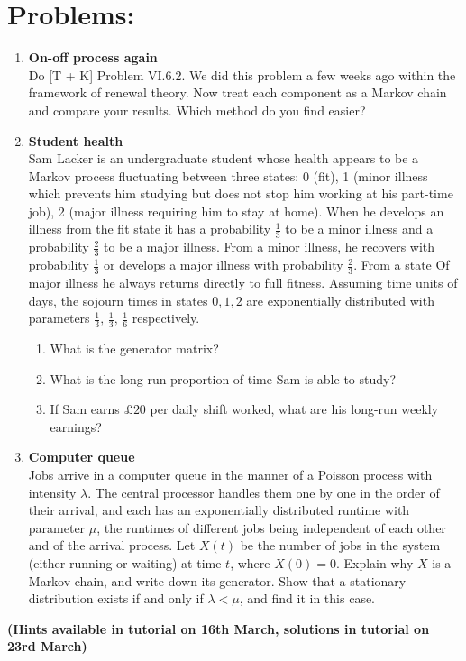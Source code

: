 \documentclass[11pt,a4paper]{article}
\begin{document}
  \section*{Problems:}
  \begin{enumerate}
    \item \textbf{On-off process again}\\
    Do [T + K] Problem VI.6.2. We did this problem a few weeks ago within the framework of renewal theory. Now treat each component as a Markov chain and compare your results. Which method do you find easier?
    \item \textbf{Student health}\\
    Sam Lacker is an undergraduate student whose health appears to be a Markov process fluctuating between three states: 0 (fit), 1 (minor illness which prevents him studying but does not stop him working at his part-time job), 2 (major illness requiring him to stay at home). When he develops an illness from the fit state it has a probability $\frac{1}{3}$ to be a minor illness and a probability $\frac{2}{3}$ to be a major illness. From a minor illness, he recovers with probability $\frac{1}{3}$ or develops a major illness with probability $\frac{2}{3}$. From a state Of major illness he always returns directly to full fitness. Assuming time units of days, the sojourn times in states $0, 1, 2$ are exponentially distributed with parameters $\frac{1}{3},\, \frac{1}{3},\, \frac{1}{6}$ respectively.
    \begin{enumerate}
      \item What is the generator matrix?
      \item What is the long-run proportion of time Sam is able to study?
      \item If Sam earns $\pounds 20$ per daily shift worked, what are his long-run weekly earnings?
    \end{enumerate}
    \item \textbf{Computer queue}\\
    Jobs arrive in a computer queue in the manner of a Poisson process with intensity $\lambda$. The central processor handles them one by one in the order of their arrival, and each has an exponentially distributed runtime with parameter $\mu$, the runtimes of different jobs being independent of each other and of the arrival process. Let $X(t)$ be the number of jobs in the system (either running or waiting) at time $t$, where $X(0) = 0$. Explain why $X$ is a Markov chain, and write down its generator. Show that a stationary distribution exists if and only if $\lambda < \mu$, and find it in this case.
  \end{enumerate}
  \textbf{(Hints available in tutorial on 16th March, solutions in tutorial on 23rd March)}
\end{document}
